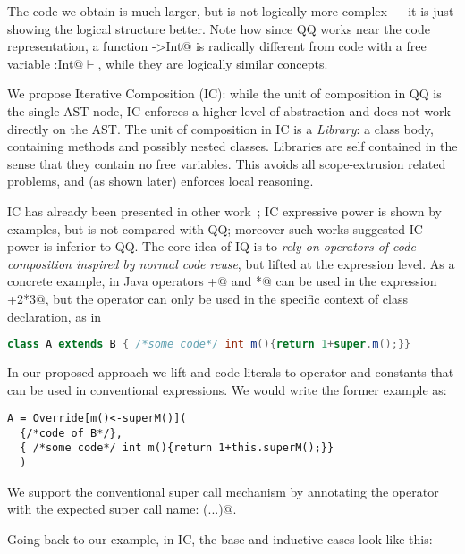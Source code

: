 The code we obtain is much larger, but is not logically more complex --- it is just showing the logical structure better.
Note how since QQ works near the code representation,
a function \Q@Int->Int@ is radically different from
code with a free variable \Q@x:Int@$\vdash$\Q@Int@, while they are 
logically similar concepts.


We propose Iterative Composition (IC):
while the unit of composition in QQ is the single AST node, 
IC enforces a higher level of abstraction and does not work directly on the AST.
The unit of composition in IC is a \emph{Library}:
a class body, containing methods and possibly nested classes.
Libraries are self contained in the sense that they contain no free variables.
This avoids all scope-extrusion related problems, and (as shown later) enforces local reasoning.

IC has already been presented in other work~\cite{servetto2014meta};
 IC expressive power is shown by examples,
but is not compared with QQ; moreover such works suggested IC power is inferior to QQ.
The core idea of IQ is to  \emph{rely on  operators of code composition inspired by normal
code reuse}, but lifted at the expression level.
As a concrete example, in Java operators \Q@+@ and \Q@*@ can be used in the expression +2*3@,
but the operator \Q@extends@ can only be used in the specific context of class declaration, as in

\begin{lstlisting}[language=Java]
class A extends B { /*some code*/ int m(){return 1+super.m();}}
\end{lstlisting}

In our proposed approach we lift \Q@extends@ and code literals to operator and constants
that can be used in conventional expressions. We would write the former example as:

\begin{lstlisting}
A = Override[m()<-superM()]( 
  {/*code of B*/},
  { /*some code*/ int m(){return 1+this.superM();}}
  )
\end{lstlisting}

\noindent We support the conventional super call mechanism by annotating the operator with
the expected super call name: \Q@Override[m()<-superM()](...)@.



Going back to our \Q@pow@ example,
in IC, the base and inductive cases look like this:

